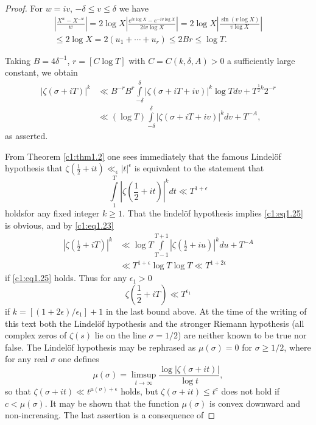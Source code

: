 \begin{proof}
For $w = iv$, $- \delta \leq v \leq \delta$ we have
\begin{multline*}
  \left|\frac{X^w - X^{-w}}{w}\right|  = 2 \log X \left| \frac{e^{i v\log X}-
    e^{- iv \log X}}{2 iv \log X}\right|= 2 \log X \left|\frac{\sin (v
    \log X)}{v \log X} \right|\\
  \leq 2 \log X = 2 (u_1 + \cdots + u_r) \leq 2 Br \leq \log T.
\end{multline*}

Taking $B= 4 \delta^{-1}$, $r= [C \log T]$ with $C= C (k, \delta , A)>
0$ a sufficiently large constant, we obtain
\begin{align*}
  |\zeta (\sigma + i T)|^k & \ll B^{-r} B^r \int\limits^\delta_{-
    \delta} |\zeta (\sigma + iT + iv)|^k \log T dv + T^{\frac{1}{2}k}
  2^{-r}\\
  & \ll (\log T) \int\limits^\delta_{- \delta} |\zeta (\sigma+ iT+
  iv)|^k dv + T^{-A},
\end{align*}
as asserted.

From Theorem \ref{c1:thm1.2} one sees immediately that the famous
Lindel\"of hypothesis that $\zeta (\frac{1}{2} + it )
\ll_\epsilon |t|^\epsilon$ is equivalent to the statement that
\begin{equation}
  \int\limits_{1}^T |\zeta\left(\frac{1}{2} + it \right)|^k dt \ll T^{1 +
    \epsilon} \label{c1:eq1.25}
\end{equation}
holds\pageoriginale for any fixed integer $k \geq 1$. That the
lindel\"of hypothesis implies \eqref{c1:eq1.25} is obvious, and by
\eqref{c1:eq1.23}
\begin{align*}
|\zeta \left(\frac{1}{2}+ iT\right)|^k &\ll \log  T \int\limits^{T+1}_{T-1} |\zeta
\left(\frac{1}{2} + iu\right)|^k du + T^{-A}\\ 
&\ll T^{1+\epsilon} \log T \log T \ll T^{1+ 2 \epsilon}
\end{align*}
if \eqref{c1:eq1.25} holds. Thus for any $\epsilon_1 > 0$
$$
\zeta (\frac{1}{2} + i T) \ll T^{\epsilon_1}
$$
if $k= [(1+ 2 \epsilon)/\epsilon_1]+1$ in the last bound above. At the
time of the writing of this text both the Lindel\"of hypothesis and
the stronger Riemann hypothesis (all complex zeros of $\zeta(s)$ lie
on the line $\sigma= 1/2$) are neither known to be true nor false. The
Lindel\"of hypothesis may be rephrased as $\mu (\sigma)=0$ for $\sigma
\geq 1/2$, where for any real $\sigma$ one defines
$$
\mu(\sigma) = \mathop{\lim\sup}_{t \to \infty} \frac{\log |\zeta
  (\sigma + it )|}{\log t},
$$
so that $\zeta (\sigma + it ) \ll t^{\mu (\sigma) + \epsilon}$
holds, but $\zeta(\sigma+ it ) \leq t^c$ does not hold if $c<
\mu (\sigma)$. It may be shown that the function $\mu (\sigma)$ is
convex downward and non-increasing. The last assertion is a
consequence of 
\end{proof}


